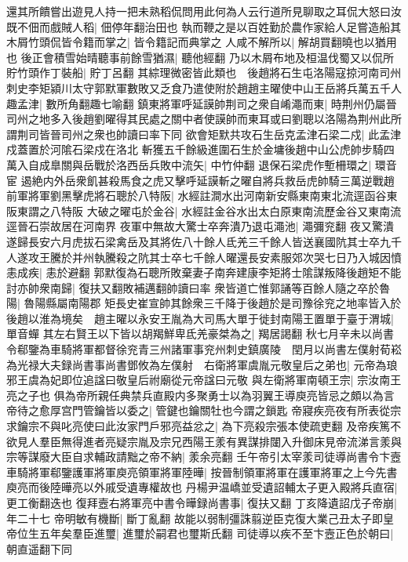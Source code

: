 還其所饋嘗出遊見人持一把未熟稻侃問用此何為人云行道所見聊取之耳侃大怒曰汝既不佃而戲賊人稻|{
	佃停年翻治田也}
執而鞭之是以百姓勤於農作家給人足嘗造船其木屑竹頭侃皆令籍而掌之|{
	皆令籍記而典掌之}
人咸不解所以|{
	解胡買翻曉也以猶用也}
後正會積雪始晴聽事前餘雪猶濕|{
	聽他經翻}
乃以木屑布地及桓温伐蜀又以侃所貯竹頭作丁裝船|{
	貯丁呂翻}
其綜理微密皆此類也　後趙將石生屯洛陽寇掠河南司州刺史李矩潁川太守郭默軍數敗又乏食乃遣使附於趙趙主曜使中山王岳將兵萬五千人趣孟津|{
	數所角翻趣七喻翻}
鎮東將軍呼延謨帥荆司之衆自崤澠而東|{
	時荆州仍屬晉司州之地多入後趙劉曜得其民處之關中者使謨帥而東耳或曰劉聰以洛陽為荆州此所謂荆司皆晉司州之衆也帥讀曰率下同}
欲會矩默共攻石生岳克孟津石梁二戍|{
	此孟津戍蓋置於河隂石梁戍在洛北}
斬獲五千餘級進圍石生於金墉後趙中山公虎帥步騎四萬入自成臯關與岳戰於洛西岳兵敗中流矢|{
	中竹仲翻}
退保石梁虎作塹柵環之|{
	環音宦}
遏絶内外岳衆飢甚殺馬食之虎又擊呼延謨斬之曜自將兵救岳虎帥騎三萬逆戰趙前軍將軍劉黑擊虎將石聰於八特阪|{
	水經註澗水出河南新安縣東南東北流逕函谷東阪東謂之八特阪}
大破之曜屯於金谷|{
	水經註金谷水出太白原東南流歷金谷又東南流逕晉石崇故居在河南界}
夜軍中無故大驚士卒奔潰乃退屯澠池|{
	澠彌兖翻}
夜又驚潰遂歸長安六月虎拔石梁禽岳及其將佐八十餘人氐羌三千餘人皆送襄國阬其士卒九千人遂攻王騰於并州執騰殺之阬其士卒七千餘人曜還長安素服郊次哭七日乃入城因憤恚成疾|{
	恚於避翻}
郭默復為石聰所敗棄妻子南奔建康李矩將士隂謀叛降後趙矩不能討亦帥衆南歸|{
	復扶又翻敗補邁翻帥讀曰率}
衆皆道亡惟郭誦等百餘人隨之卒於魯陽|{
	魯陽縣屬南陽郡}
矩長史崔宣帥其餘衆三千降于後趙於是司豫徐兖之地率皆入於後趙以淮為境矣　趙主曜以永安王胤為大司馬大單于徙封南陽王置單于臺于渭城|{
	單音蟬}
其左右賢王以下皆以胡羯鮮卑氐羌豪桀為之|{
	羯居謁翻}
秋七月辛未以尚書令郗鑒為車騎將軍都督徐兖青三州諸軍事兖州刺史鎮廣陵　閏月以尚書左僕射荀崧為光禄大夫録尚書事尚書鄧攸為左僕射　右衛將軍虞胤元敬皇后之弟也|{
	元帝為琅邪王虞為妃即位追諡曰敬皇后祔廟從元帝諡曰元敬}
與左衛將軍南頓王宗|{
	宗汝南王亮之子也}
俱為帝所親任典禁兵直殿内多聚勇士以為羽翼王導庾亮皆忌之頗以為言帝待之愈厚宫門管鑰皆以委之|{
	管鍵也鑰關牡也今謂之鎖匙}
帝寢疾亮夜有所表從宗求鑰宗不與叱亮使曰此汝家門戶邪亮益忿之|{
	為下亮殺宗張本使疏吏翻}
及帝疾篤不欲見人羣臣無得進者亮疑宗胤及宗兄西陽王羕有異謀排闥入升御床見帝流涕言羕與宗等謀廢大臣自求輔政請黜之帝不納|{
	羕余亮翻}
壬午帝引太宰羕司徒導尚書令卞壼車騎將軍郗鑒護軍將軍庾亮領軍將軍陸曄|{
	按晉制領軍將軍在護軍將軍之上今先書庾亮而後陸曄亮以外戚受遺專權故也}
丹楊尹温嶠並受遺詔輔太子更入殿將兵直宿|{
	更工衡翻迭也}
復拜壼右將軍亮中書令曄録尚書事|{
	復扶又翻}
丁亥降遺詔戊子帝崩|{
	年二十七}
帝明敏有機斷|{
	斷丁亂翻}
故能以弱制彊誅翦逆臣克復大業己丑太子即皇帝位生五年矣羣臣進璽|{
	進璽於嗣君也璽斯氏翻}
司徒導以疾不至卞壼正色於朝曰|{
	朝直遥翻下同}
